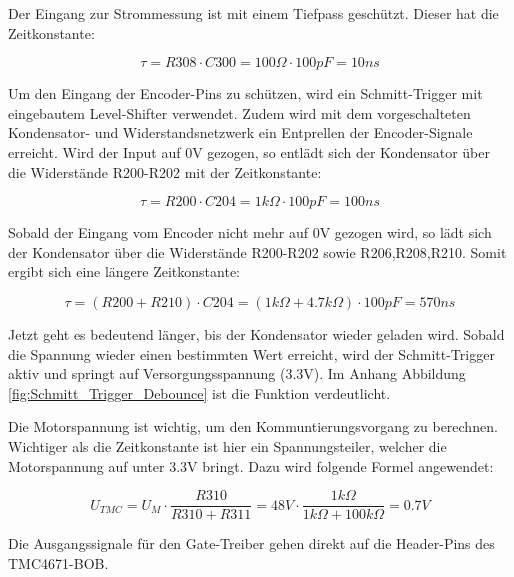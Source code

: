 Der Eingang zur Strommessung ist mit einem Tiefpass geschützt. Dieser hat die Zeitkonstante:

\begin{equation}
\tau = R308 \cdot C300 = 100\Omega \cdot 100pF = 10ns
\end{equation}


Um den Eingang der Encoder-Pins zu schützen, wird ein Schmitt-Trigger mit eingebautem Level-Shifter verwendet. Zudem wird mit dem vorgeschalteten Kondensator- und Widerstandsnetzwerk ein Entprellen der Encoder-Signale erreicht. Wird der Input auf 0V gezogen, so entlädt sich der Kondensator über die Widerstände R200-R202 mit der Zeitkonstante:

\begin{equation}
\tau = R200 \cdot C204 = 1k\Omega \cdot 100pF = 100ns
\end{equation}

Sobald der Eingang vom Encoder nicht mehr auf 0V gezogen wird, so lädt sich der Kondensator über die Widerstände R200-R202 sowie R206,R208,R210. Somit ergibt sich eine längere Zeitkonstante:

\begin{equation}
\tau = (R200 + R210) \cdot C204 = (1k\Omega + 4.7k\Omega) \cdot 100pF = 570ns
\end{equation}

Jetzt geht es bedeutend länger, bis der Kondensator wieder geladen wird. Sobald die Spannung wieder einen bestimmten Wert erreicht, wird der Schmitt-Trigger aktiv und springt auf Versorgungsspannung (3.3V). Im Anhang Abbildung \ref{fig:Schmitt_Trigger_Debounce} ist die Funktion verdeutlicht.


Die Motorspannung ist wichtig, um den Kommuntierungsvorgang zu berechnen. Wichtiger als die Zeitkonstante ist hier ein Spannungsteiler, welcher die Motorspannung auf unter 3.3V bringt. Dazu wird folgende Formel angewendet:

\begin{equation}
U_{TMC} = U_M \cdot \frac{R310}{R310 + R311} = 48V \cdot \frac{1k\Omega}{1k\Omega + 100k\Omega} = 0.7V
\end{equation}


Die Ausgangssignale für den Gate-Treiber gehen direkt auf die Header-Pins des TMC4671-BOB.


